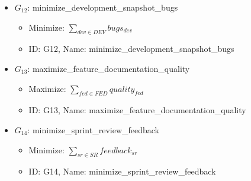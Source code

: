 \documentclass{article}
\begin{document}
\begin{itemize}
    \item $G_{12}$: minimize\_development\_snapshot\_bugs
        \begin{itemize}
            \item Minimize: $\sum_{dev \in DEV} bugs_{dev}$
            \item ID: G12, Name: minimize\_development\_snapshot\_bugs
        \end{itemize}
    \item $G_{13}$: maximize\_feature\_documentation\_quality
        \begin{itemize}
            \item Maximize: $\sum_{fed \in FED} quality_{fed}$
            \item ID: G13, Name: maximize\_feature\_documentation\_quality
        \end{itemize}
    \item $G_{14}$: minimize\_sprint\_review\_feedback
        \begin{itemize}
            \item Minimize: $\sum_{sr \in SR} feedback_{sr}$
            \item ID: G14, Name: minimize\_sprint\_review\_feedback
        \end{itemize}
\end{itemize}
\end{document}
